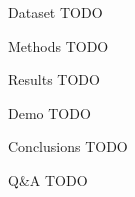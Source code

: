 \documentclass{beamer}
\begin{document}
\begin{frame}{Dataset}
TODO
\end{frame}

\begin{frame}{Methods}
TODO
\end{frame}

\begin{frame}{Results}
TODO
\end{frame}

\begin{frame}{Demo}
TODO
\end{frame}

\begin{frame}{Conclusions}
TODO
\end{frame}

\begin{frame}{Q\&A}
TODO
\end{frame}
\end{document}
